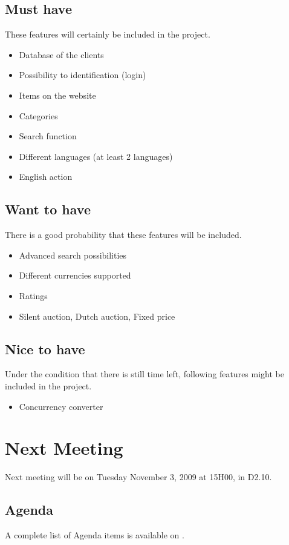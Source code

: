 \documentclass[a4paper, 12pt]{article}
\begin{document}
	\subsection{Must have}
	These features will certainly be included in the project.
		\begin{itemize}
			\item Database of the clients
			\item Possibility to identification (login)
			\item Items on the website
			\item Categories
			\item Search function
			\item Different languages (at least 2 languages)
			\item English action
		\end{itemize}
	
	\subsection{Want to have}
	There is a good probability that these features will be included.
		\begin{itemize}
			\item Advanced search possibilities
			\item Different currencies supported
			\item Ratings
			\item Silent auction, Dutch auction, Fixed price 
		\end{itemize}
		
	\subsection{Nice to have}
	Under the condition that there is still time left, following features might be included in the project.
		\begin{itemize}
			\item Concurrency converter
		\end{itemize}
		
	\section{Next Meeting}
	
	Next meeting will be on Tuesday November 3, 2009 at 15H00, in D2.10. 
	
	\subsection{Agenda}
	A complete list of Agenda items is available on \cite{site2}.
\end{document}
